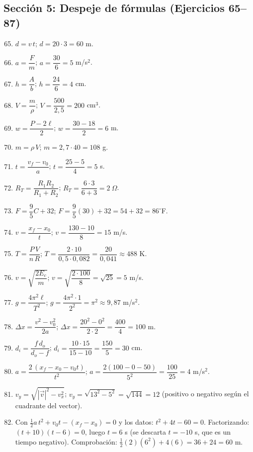 \documentclass[12pt, letterpaper]{article}
\begin{document}
  \subsection*{Sección 5: Despeje de fórmulas (Ejercicios 65--87)}

  \begin{enumerate}[leftmargin=*, label=\textbf{\arabic*.}]
    \setcounter{enumi}{64}
    \item $d = v\,t$; $d = 20 \cdot 3 = 60$ m.
    \item $a = \dfrac{F}{m}$; $a = \dfrac{30}{6} = 5$ m/s$^2$.
    \item $h = \dfrac{A}{b}$; $h = \dfrac{24}{6} = 4$ cm.
    \item $V = \dfrac{m}{\rho}$; $V = \dfrac{500}{2{,}5} = 200$ cm$^3$.
    \item $w = \dfrac{P - 2\ell}{2}$; $w = \dfrac{30 - 18}{2} = 6$ m.
    \item $m = \rho\,V$; $m = 2{,}7 \cdot 40 = 108$ g.
    \item $t = \dfrac{v_f - v_0}{a}$; $t = \dfrac{25 - 5}{4} = 5$ s.
    \item $R_T = \dfrac{R_1 R_2}{R_1 + R_2}$; $R_T = \dfrac{6 \cdot 3}{6 + 3} = 2\ \Omega$.
    \item $F = \dfrac{9}{5}C + 32$; $F = \dfrac{9}{5}(30) + 32 = 54 + 32 = 86^{\circ}$F.
    \item $v = \dfrac{x_f - x_0}{t}$; $v = \dfrac{130 - 10}{8} = 15$ m/s.
    \item $T = \dfrac{P\,V}{n\,R}$; $T = \dfrac{2 \cdot 10}{0{,}5 \cdot 0{,}082} = \dfrac{20}{0{,}041} \approx 488$ K.
    \item $v = \sqrt{\dfrac{2E_c}{m}}$; $v = \sqrt{\dfrac{2 \cdot 100}{8}} = \sqrt{25} = 5$ m/s.
    \item $g = \dfrac{4\pi^2 \ell}{T^2}$; $g = \dfrac{4\pi^2 \cdot 1}{2^2} = \pi^2 \approx 9{,}87$ m/s$^2$.
    \item $\Delta x = \dfrac{v^2 - v_0^2}{2a}$; $\Delta x = \dfrac{20^2 - 0^2}{2 \cdot 2} = \dfrac{400}{4} = 100$ m.
    \item $d_i = \dfrac{f\,d_o}{d_o - f}$; $d_i = \dfrac{10 \cdot 15}{15 - 10} = \dfrac{150}{5} = 30$ cm.
    \item $a = \dfrac{2\,(x_f - x_0 - v_0 t)}{t^2}$; $a = \dfrac{2(100 - 0 - 50)}{5^2} = \dfrac{100}{25} = 4$ m/s$^2$.
    \item $v_y = \sqrt{|\vec{v}|^2 - v_x^2}$; $v_y = \sqrt{13^2 - 5^2} = \sqrt{144} = 12$ (positivo o negativo según el cuadrante del vector).
    \item Con $\frac{1}{2}a\,t^2 + v_0 t - (x_f - x_0) = 0$ y los datos: $t^2 + 4t - 60 = 0$. Factorizando: $(t + 10)(t - 6) = 0$, luego $t = 6$ s (se descarta $t = -10$ s, que es un tiempo negativo). Comprobación: $\frac{1}{2}(2)(6^2) + 4(6) = 36 + 24 = 60$ m. \checkmark

\end{enumerate}
\end{document}
